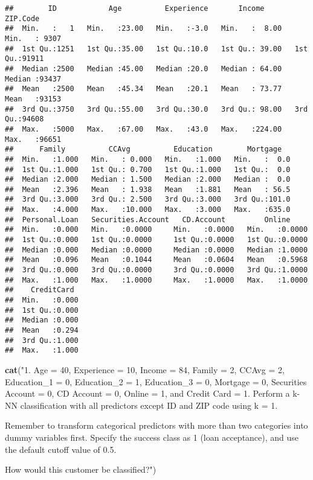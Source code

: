 \documentclass[
]{article}
\newenvironment{Shaded}{\begin{snugshade}}{\end{snugshade}}
\newcommand{\FunctionTok}[1]{\textcolor[rgb]{0.13,0.29,0.53}{\textbf{#1}}}
\newcommand{\NormalTok}[1]{#1}
\newcommand{\StringTok}[1]{\textcolor[rgb]{0.31,0.60,0.02}{#1}}
\begin{document}
\begin{verbatim}
##        ID            Age          Experience       Income          ZIP.Code    
##  Min.   :   1   Min.   :23.00   Min.   :-3.0   Min.   :  8.00   Min.   : 9307  
##  1st Qu.:1251   1st Qu.:35.00   1st Qu.:10.0   1st Qu.: 39.00   1st Qu.:91911  
##  Median :2500   Median :45.00   Median :20.0   Median : 64.00   Median :93437  
##  Mean   :2500   Mean   :45.34   Mean   :20.1   Mean   : 73.77   Mean   :93153  
##  3rd Qu.:3750   3rd Qu.:55.00   3rd Qu.:30.0   3rd Qu.: 98.00   3rd Qu.:94608  
##  Max.   :5000   Max.   :67.00   Max.   :43.0   Max.   :224.00   Max.   :96651  
##      Family          CCAvg          Education        Mortgage    
##  Min.   :1.000   Min.   : 0.000   Min.   :1.000   Min.   :  0.0  
##  1st Qu.:1.000   1st Qu.: 0.700   1st Qu.:1.000   1st Qu.:  0.0  
##  Median :2.000   Median : 1.500   Median :2.000   Median :  0.0  
##  Mean   :2.396   Mean   : 1.938   Mean   :1.881   Mean   : 56.5  
##  3rd Qu.:3.000   3rd Qu.: 2.500   3rd Qu.:3.000   3rd Qu.:101.0  
##  Max.   :4.000   Max.   :10.000   Max.   :3.000   Max.   :635.0  
##  Personal.Loan   Securities.Account   CD.Account         Online      
##  Min.   :0.000   Min.   :0.0000     Min.   :0.0000   Min.   :0.0000  
##  1st Qu.:0.000   1st Qu.:0.0000     1st Qu.:0.0000   1st Qu.:0.0000  
##  Median :0.000   Median :0.0000     Median :0.0000   Median :1.0000  
##  Mean   :0.096   Mean   :0.1044     Mean   :0.0604   Mean   :0.5968  
##  3rd Qu.:0.000   3rd Qu.:0.0000     3rd Qu.:0.0000   3rd Qu.:1.0000  
##  Max.   :1.000   Max.   :1.0000     Max.   :1.0000   Max.   :1.0000  
##    CreditCard   
##  Min.   :0.000  
##  1st Qu.:0.000  
##  Median :0.000  
##  Mean   :0.294  
##  3rd Qu.:1.000  
##  Max.   :1.000
\end{verbatim}

\begin{Shaded}
\begin{Highlighting}[]
\FunctionTok{cat}\NormalTok{(}\StringTok{"1. Age = 40, Experience = 10, Income = 84, Family = 2, CCAvg = 2, Education\_1 = 0, Education\_2 = 1, Education\_3 = 0, Mortgage = 0, Securities Account = 0, CD Account = 0, Online = 1, and Credit Card = 1. Perform a k{-}NN classification with all predictors except ID and ZIP code using k = 1. }

\StringTok{Remember to transform categorical predictors with more than two categories into dummy variables first. Specify the success class as 1 (loan acceptance), and use the default cutoff value of 0.5. }

\StringTok{How would this customer be classified?"}\NormalTok{)}
\end{Highlighting}
\end{Shaded}
\end{document}
